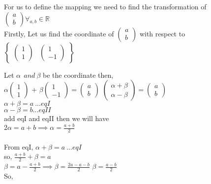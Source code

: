 \documentclass[45pt]{article}
\begin{document}
\\\\

For us to define the mapping we need to find the transformation of $\begin{pmatrix} a\\b \end{pmatrix} \forall_{a,b} \in \mathbb{R}$\\

Firstly, Let us find the coordinate of $\begin{pmatrix} a\\b \end{pmatrix}$ with respect to
$\begin{Bmatrix}
  \begin{pmatrix} 1\\1 \end{pmatrix} &
\begin{pmatrix} 1\\-1 \end{pmatrix} 
\end{Bmatrix}$

Let $\alpha ~~ and ~\beta$ be the coordinate then,\\
$\alpha \begin{pmatrix} 1\\1 \end{pmatrix}$ +
$\beta \begin{pmatrix} 1\\-1 \end{pmatrix} =\begin{pmatrix} a\\b \end{pmatrix}$
$\begin{pmatrix} \alpha+\beta\\ \alpha - \beta \end{pmatrix}=\begin{pmatrix} a\\b \end{pmatrix}$\\
$ \alpha+\beta =a~...eqI$\\
$ \alpha - \beta =b...eqII$\\
add eqI and eqII then we will have \\
$2 \alpha =a+b \implies \alpha =\frac{a+b}{2}$\\\\
From eqI, $ \alpha+\beta =a~...eqI$\\
so, $\frac{a+b}{2} +\beta =a$\\
$\beta =a-\frac{a+b}{2} \implies \beta = \frac{2a-a-b}{2}$
$\beta =\frac{a-b}{2}$\\
So, 
\end{document}
